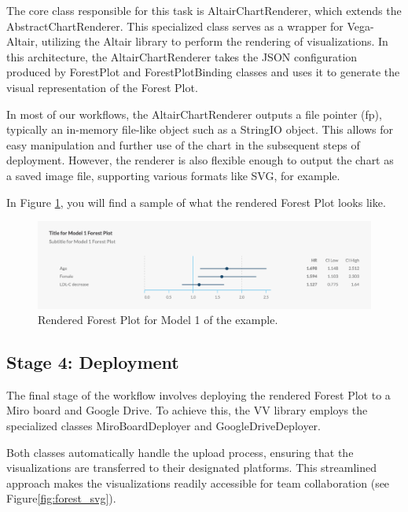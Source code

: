The core class responsible for this task is AltairChartRenderer, which
extends the AbstractChartRenderer. This specialized class serves as a
wrapper for Vega-Altair, utilizing the Altair library to perform the
rendering of visualizations. In this architecture, the
AltairChartRenderer takes the JSON configuration produced by ForestPlot
and ForestPlotBinding classes and uses it to generate the visual
representation of the Forest Plot.

In most of our workflows, the AltairChartRenderer outputs a file pointer
(fp), typically an in-memory file-like object such as a StringIO object.
This allows for easy manipulation and further use of the chart in the
subsequent steps of deployment. However, the renderer is also flexible
enough to output the chart as a saved image file, supporting various
formats like SVG, for example.

In Figure \ref{fig:forest}, you will find a sample of what the rendered Forest Plot
looks like.

\begin{figure}[ht]
  \centering
  \includegraphics[width=\textwidth]{media/fig15.png}
  \caption{Rendered Forest Plot for Model 1 of the example.}
  \label{fig:forest}
\end{figure}

\subsection{Stage 4: Deployment}\label{stage-4-deployment}

The final stage of the workflow involves deploying the rendered Forest
Plot to a Miro board and Google Drive. To achieve this, the VV library
employs the specialized classes MiroBoardDeployer and
GoogleDriveDeployer.

Both classes automatically handle the upload process, ensuring that the
visualizations are transferred to their designated platforms. This
streamlined approach makes the visualizations readily accessible for
team collaboration (see Figure\ref{fig:forest_svg}).

